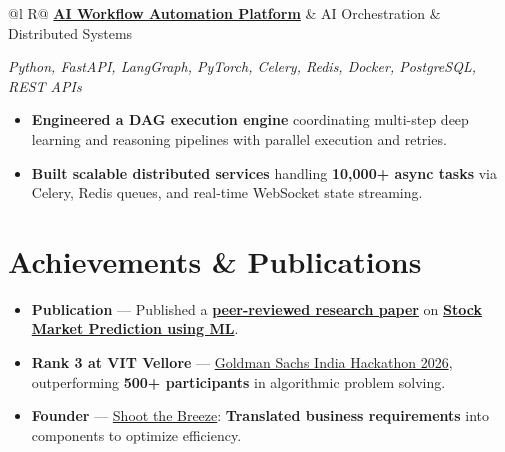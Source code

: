 \documentclass[a4paper,11pt]{article}
\newcommand{\subheading}[1]{\textbf{#1}}
\newcommand{\meta}[1]{{\fontsize{10}{12}\selectfont\textcolor[HTML]{3A3A3A}{#1}}}
\newcommand{\techstack}[1]{{\fontsize{10}{12}\selectfont\textcolor[HTML]{1A1A1A}{\textit{#1}}}}
\newcommand{\ulink}[2]{\href{#1}{#2}}
\begin{document}
\begin{tabularx}{\linewidth}{@{}l R@{}}
\subheading{\ulink{https://github.com/su-jin1425/AI-Workflow-Automation-Platform}{AI Workflow Automation Platform}} & \meta{AI Orchestration \& Distributed Systems}
\end{tabularx}
\techstack{Python, FastAPI, LangGraph, PyTorch, Celery, Redis, Docker, PostgreSQL, REST APIs}
\begin{itemize}[nosep, leftmargin=1.5em, itemsep=2pt, topsep=2pt]
  \item {\color[HTML]{0A0A0A}\fontsize{11}{14}\selectfont \textbf{Engineered a DAG execution engine} coordinating multi-step deep learning and reasoning pipelines with parallel execution and retries.}
  \item {\color[HTML]{0A0A0A}\fontsize{11}{14}\selectfont \textbf{Built scalable distributed services} handling \textbf{10,000+ async tasks} via Celery, Redis queues, and real-time WebSocket state streaming.}
\end{itemize}

\section{Achievements \& Publications}
\vspace{2pt}

\begin{itemize}[nosep, leftmargin=1.5em, itemsep=2pt, topsep=2pt]
  \item {\color[HTML]{0A0A0A}\fontsize{11}{14}\selectfont \textbf{Publication} --- Published a \ulink{https://www.elruha.org/_files/ugd/614b1f_6b95e1b697bf452b9907ba46e0151c05.pdf\#page=774}{\textbf{peer-reviewed research paper}} on \ulink{https://github.com/su-jin1425/Set-Project}{\textbf{Stock Market Prediction using ML}}.}
  \item {\color[HTML]{0A0A0A}\fontsize{11}{14}\selectfont \textbf{Rank 3 at VIT Vellore} --- \ulink{https://www.hackerrank.com/contests/goldman-sachs-india-hackathon-2026-cs/leaderboard}{Goldman Sachs India Hackathon 2026}, outperforming \textbf{500+ participants} in algorithmic problem solving.}
  \item {\color[HTML]{0A0A0A}\fontsize{11}{14}\selectfont \textbf{Founder} --- \ulink{https://shoot-the-breeze.vercel.app}{Shoot the Breeze}: \textbf{Translated business requirements} into components to optimize efficiency.}
\end{itemize}

\end{document}
